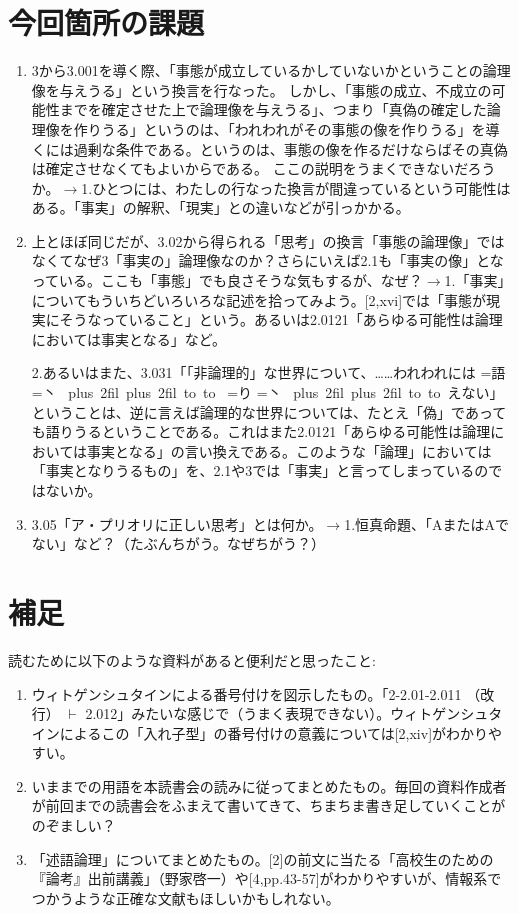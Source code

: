 \documentclass[11pt,a4paper]{jsarticle}
\newcommand{\ruby}[2]{%
    \leavevmode
    \setbox0=\hbox{#1}%
    \setbox1=\hbox{\tiny #2}%
    \ifdim\wd0>\wd1 \dimen0=\wd0 \else \dimen0=\wd1 \fi
    \hbox{%
    \kanjiskip=0pt plus 2fil
    \xkanjiskip=0pt plus 2fil
    \vbox{%
    \hbox to \dimen0{%
    \tiny \hfil#2\hfil}%
    \nointerlineskip
    \hbox to \dimen0{\mathstrut\hfil#1\hfil}}}}
\begin{document}
\section{今回箇所の課題} \label{konkadai}
\begin{enumerate}
\item
3から3.001を導く際、「事態が成立しているかしていないかということの論理像を与えうる」という換言を行なった。
しかし、「事態の成立、不成立の可能性までを確定させた上で論理像を与えうる」、つまり「真偽の確定した論理像を作りうる」というのは、「われわれがその事態の像を作りうる」を導くには過剰な条件である。というのは、事態の像を作るだけならばその真偽は確定させなくてもよいからである。
ここの説明をうまくできないだろうか。$\rightarrow$1.ひとつには、わたしの行なった換言が間違っているという可能性はある。「事実」の解釈、「現実」との違いなどが引っかかる。
\item
上とほぼ同じだが、3.02から得られる「思考」の換言「事態の論理像」ではなくてなぜ3「事実の」論理像なのか？さらにいえば2.1も「事実の像」となっている。ここも「事態」でも良さそうな気もするが、なぜ？$\rightarrow$1.「事実」についてもういちどいろいろな記述を拾ってみよう。[2,xvi]では「事態が現実にそうなっていること」という。あるいは2.0121「あらゆる可能性は論理においては事実となる」など。

2.あるいはまた、3.031「「非論理的」な世界について、……われわれには\ruby{語}{丶}\ruby{り}{丶}えない」ということは、逆に言えば論理的な世界については、たとえ「偽」であっても語りうるということである。これはまた2.0121「あらゆる可能性は論理においては事実となる」の言い換えである。このような「論理」においては「事実となりうるもの」を、2.1や3では「事実」と言ってしまっているのではないか。
\item
3.05「ア・プリオリに正しい思考」とは何か。$\rightarrow$1.恒真命題、「AまたはAでない」など？（たぶんちがう。なぜちがう？）
\end{enumerate}


\section{補足} \label{hosoku}
読むために以下のような資料があると便利だと思ったこと:
\begin{enumerate}
\item
ウィトゲンシュタインによる番号付けを図示したもの。「2-2.01-2.011 （改行） $\vdash$ 2.012」みたいな感じで（うまく表現できない）。ウィトゲンシュタインによるこの「入れ子型」の番号付けの意義については[2,xiv]がわかりやすい。
\item
いままでの用語を本読書会の読みに従ってまとめたもの。毎回の資料作成者が前回までの読書会をふまえて書いてきて、ちまちま書き足していくことがのぞましい？
\item
「述語論理」についてまとめたもの。[2]の前文に当たる「高校生のための『論考』出前講義」（野家啓一）や[4,pp.43-57]がわかりやすいが、情報系でつかうような正確な文献もほしいかもしれない。
\end{enumerate}
\end{document}
